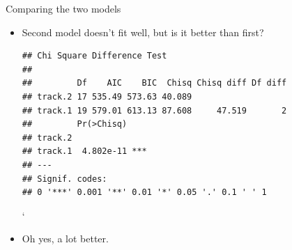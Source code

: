 \begin{frame}[fragile]{Comparing the two models}
  
  \begin{itemize}
  \item Second model doesn't fit well, but is it better than first?

    {\small    

\begin{knitrout}
\color{fgcolor}\begin{kframe}
\begin{alltt}
\end{alltt}
\begin{verbatim}
## Chi Square Difference Test
## 
##         Df    AIC    BIC  Chisq Chisq diff Df diff
## track.2 17 535.49 573.63 40.089                   
## track.1 19 579.01 613.13 87.608     47.519       2
##         Pr(>Chisq)    
## track.2               
## track.1  4.802e-11 ***
## ---
## Signif. codes:  
## 0 '***' 0.001 '**' 0.01 '*' 0.05 '.' 0.1 ' ' 1
\end{verbatim}
\end{kframe}
\end{knitrout}
}

`
\item Oh yes, a lot better.
    
  \end{itemize}
  
\end{frame}
  
